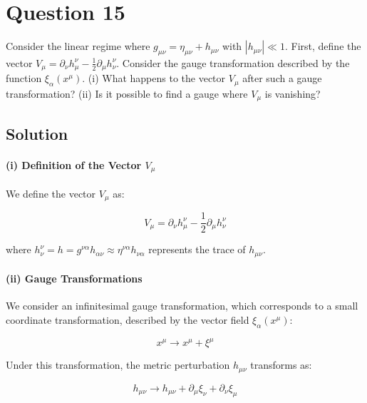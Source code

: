 \section*{Question 15}

Consider the linear regime where $g_{\mu \nu}=\eta_{\mu \nu}+h_{\mu \nu}$ with $\left|h_{\mu \nu}\right| \ll 1$. First, define the vector $V_{\mu}=\partial_{\nu} h_{\mu}^{\nu}-\frac{1}{2} \partial_{\mu} h_{\nu}^{\nu}$. Consider the gauge transformation described by the function $\xi_{\alpha}\left(x^{\mu}\right)$. (i) What happens to the vector $V_{\mu}$ after such a gauge transformation? (ii) Is it possible to find a gauge where $V_{\mu}$ is vanishing?

\subsection*{Solution}

\paragraph{(i) Definition of the Vector $V_{\mu}$}

We define the vector $V_{\mu}$ as:

\begin{equation}
V_{\mu} = \partial_{\nu} h_{\mu}^{\nu} - \frac{1}{2} \partial_{\mu} h_{\nu}^{\nu}
\end{equation}

where $h_{\nu}^{\nu} = h = g^{\nu\alpha}h_{\alpha\nu} \approx \eta^{\nu \alpha}h_{\nu \alpha}$ represents the trace of $h_{\mu \nu}$.

\paragraph{(ii) Gauge Transformations}

We consider an infinitesimal gauge transformation, which corresponds to a small coordinate transformation, described by the vector field $\xi_{\alpha}(x^{\mu})$:

\begin{equation}
x^{\mu} \to x^{\mu} + \xi^{\mu}
\end{equation}

Under this transformation, the metric perturbation $h_{\mu \nu}$ transforms as:

\begin{equation}
h_{\mu \nu} \to h_{\mu \nu} + \partial_{\mu} \xi_{\nu} + \partial_{\nu} \xi_{\mu}
\end{equation}

